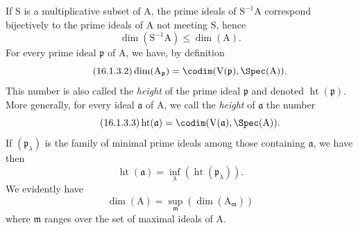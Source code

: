\begin{env}[16.1.3]
\label{0.16.1.3}
If $\mathrm{S}$ is a multiplicative subset of $\mathrm{A}$, the prime ideals of $\mathrm{S}^{-1}\mathrm{A}$ correspond bijectively to the prime ideals of $\mathrm{A}$ not meeting $\mathrm{S}$, hence
\begin{equation}
\label{0.16.1.3.1}
\tag{16.1.3.1}
  \dim(\mathrm{S}^{-1}\mathrm{A})\leq\dim(\mathrm{A}).
\end{equation}
For every prime ideal $\mathfrak{p}$ of $\mathrm{A}$, we have, by definition 
\begin{equation}
\label{0.16.1.3.2}
\tag{16.1.3.2}
  \dim(\mathrm{A}_\mathfrak{p})=\codim(\mathrm{V}(\mathfrak{p}),\Spec(\mathrm{A})).
\end{equation}
This number is also called the \emph{height} of the prime ideal $\mathfrak{p}$ and denoted $\operatorname{ht}(\mathfrak{p})$.
More generally, for every ideal $\mathfrak{a}$ of $\mathrm{A}$, we call the \emph{height} of $\mathfrak{a}$ the number
\begin{equation}
\label{0.16.1.3.3}
\tag{16.1.3.3}
  \operatorname{ht}(\mathfrak{a})=\codim(\mathrm{V}(\mathfrak{a}),\Spec(\mathrm{A})).
\end{equation}
If $(\mathfrak{p}_\lambda)$ is the family of minimal prime ideals among those containing $\mathfrak{a}$, we have then 
\begin{equation}
\label{0.16.1.3.4}
\tag{16.1.3.4}
  \operatorname{ht}(\mathfrak{a})=\inf_\lambda(\operatorname{ht}(\mathfrak{p}_\lambda)).
\end{equation}
We evidently have
\begin{equation}
\label{0.16.1.3.5}
\tag{16.1.3.5}
  \dim(\mathrm{A})=\sup_\mathfrak{m}(\dim(\mathrm{A}_\mathfrak{m}))
\end{equation}
where $\mathfrak{m}$ ranges over the set of maximal ideals of $\mathrm{A}$.
\end{env}

